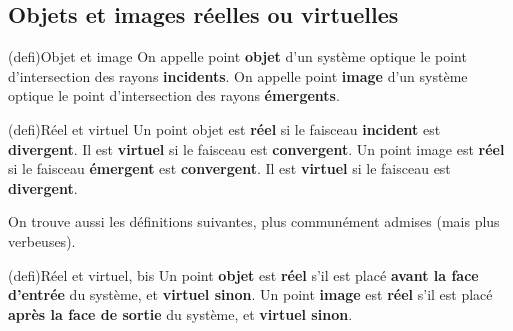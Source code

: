 \documentclass[../../main/main.tex]{subfiles}
\begin{document}
\subsection{Objets et images réelles ou virtuelles}

\begin{tcb}[label=def:objimg, sidebyside](defi){Objet et image}
	On appelle point \textbf{objet} d'un système optique le point d'intersection
	des rayons \textbf{incidents}.
	\tcblower
	On appelle point \textbf{image} d'un système optique le point d'intersection
	des rayons \textbf{émergents}.
\end{tcb}

\begin{tcb}[label=reelvirt, sidebyside](defi){Réel et virtuel}
	Un point objet est \textbf{réel} si le faisceau \textbf{incident} est
	\textbf{divergent}. Il est \textbf{virtuel} si le faisceau est
	\textbf{convergent}.
	\tcblower
	Un point image est \textbf{réel} si le faisceau \textbf{émergent} est
	\textbf{convergent}. Il est \textbf{virtuel} si le faisceau est
	\textbf{divergent}.
\end{tcb}

On trouve aussi les définitions suivantes, plus communément admises (mais plus
verbeuses).

\begin{tcb}[label=reelvirt2, sidebyside](defi){{Réel et virtuel, bis}}
	Un point \textbf{objet} est \textbf{réel} s'il est placé \textbf{avant la
		face d'entrée} du système, et \textbf{virtuel sinon}.
	\tcblower
	Un point \textbf{image} est \textbf{réel} s'il est placé \textbf{après la
		face de sortie} du système, et \textbf{virtuel sinon}.
\end{tcb}
\end{document}
